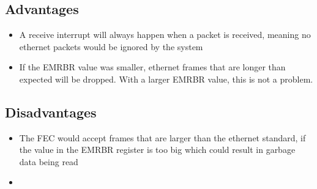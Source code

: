 \section{}
\subsection*{Advantages}
\begin{itemize}
  \item A receive interrupt will always happen when a packet is received,
    meaning no ethernet packets would be ignored by the system
  \item If the EMRBR value was smaller, ethernet frames that are longer than
    expected will be dropped. With a larger EMRBR value, this is not a problem.
\end{itemize}

\subsection*{Disadvantages}
\begin{itemize}
  \item The FEC would accept frames that are larger than the ethernet standard,
    if the value in the EMRBR register is too big which could result in garbage
    data being read
  \item 
\end{itemize}
